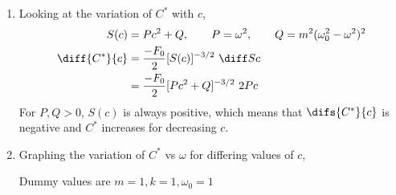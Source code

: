 \begin{enumerate}
\begin{enumerate}
              \item Looking at the variation of $ C^{*} $ with $ c $,
                    \begin{align}
                        S(c)             & = Pc^{2} + Q, \qquad P = \omega^{2},
                        \qquad Q = m^{2}(\omega_{0}^{2} - \omega^{2})^{2}         \\
                        \diff {C^{*}}{c} & = \frac{-F_{0}}{2} [S(c)]^{-3/2}
                        \ \diff Sc                                                \\
                                         & = \frac{-F_{0}}{2} [Pc^{2} + Q]^{-3/2}
                        \ 2Pc                                                     \\
                    \end{align}
                    For $ P, Q > 0 $, $ S(c) $ is always positive, which means that
                    $ \difs {C^{*}}{c} $ is negative and $ C^{*} $ increases for
                    decreasing $ c $.

              \item Graphing the variation of $ C^{*} $ vs $ \omega $ for differing
                    values of $ c $, \par Dummy values are
                    $ m = 1, k = 1, \omega_{0} = 1 $


\end{enumerate}
\end{enumerate}
